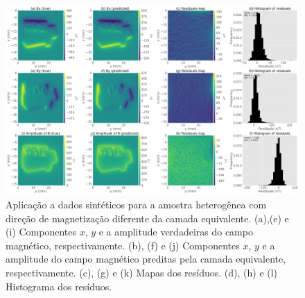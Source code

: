 \begin{figure}
	\centering
	\includegraphics[width=1.15\textwidth]{Fig/mag_vec/simulacao_real_errado/comparison_true_estimated.png}
	\caption{Aplicação a dados sintéticos para a amostra heterogênea com direção de magnetização diferente da camada equivalente. (a),(e) e (i) Componentes $x$, $y$ e a amplitude verdadeiras do campo magnético, respectivamente. (b), (f) e (j) Componentes $x$, $y$ e a amplitude do campo magnético preditas pela camada equivalente, respectivamente. (c), (g) e (k) Mapas dos resíduos. (d), (h) e (l) Histograma dos resíduos.}
	\label{fig:comparison_hetero_sample_difdir}
\end{figure}


